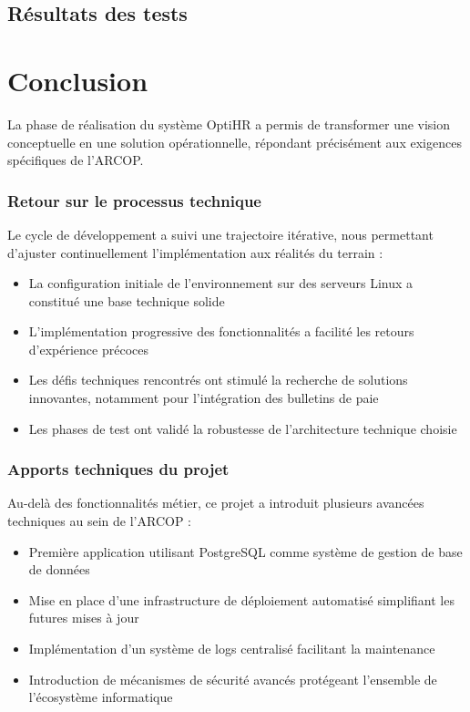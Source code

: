 \subsection{Résultats des tests}

\section{Conclusion}

La phase de réalisation du système OptiHR a permis de transformer une vision conceptuelle en une solution opérationnelle, répondant précisément aux exigences spécifiques de l'ARCOP.

\subsubsection{Retour sur le processus technique}

Le cycle de développement a suivi une trajectoire itérative, nous permettant d'ajuster continuellement l'implémentation aux réalités du terrain :

\begin{itemize}
    \item La configuration initiale de l'environnement sur des serveurs Linux a constitué une base technique solide
    \item L'implémentation progressive des fonctionnalités a facilité les retours d'expérience précoces
    \item Les défis techniques rencontrés ont stimulé la recherche de solutions innovantes, notamment pour l'intégration des bulletins de paie
    \item Les phases de test ont validé la robustesse de l'architecture technique choisie
\end{itemize}

\subsubsection{Apports techniques du projet}

Au-delà des fonctionnalités métier, ce projet a introduit plusieurs avancées techniques au sein de l'ARCOP :

\begin{itemize}
    \item Première application utilisant PostgreSQL comme système de gestion de base de données
    \item Mise en place d'une infrastructure de déploiement automatisé simplifiant les futures mises à jour
    \item Implémentation d'un système de logs centralisé facilitant la maintenance
    \item Introduction de mécanismes de sécurité avancés protégeant l'ensemble de l'écosystème informatique
\end{itemize}

